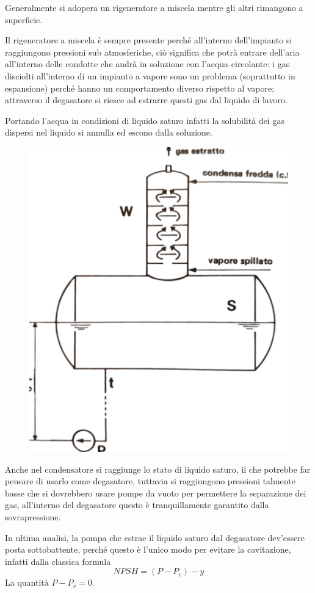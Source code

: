 \begin{adjustwidth}{2in}{}
	Generalmente si adopera un rigeneratore a miscela mentre gli altri rimangono a superficie. 
	
	Il rigeneratore a miscela è sempre presente perché all'interno dell'impianto si raggiungono pressioni sub atmosferiche, ciò significa che potrà entrare dell'aria all'interno delle condotte che andrà in soluzione con l'acqua circolante: i gas disciolti all'interno di un impianto a vapore sono un problema (soprattutto in espansione) perché hanno un comportamento diverso rispetto al vapore; attraverso il degasatore si riesce ad estrarre questi gas dal liquido di lavoro.
	
	Portando l'acqua in condizioni di liquido saturo infatti la solubilità dei gas dispersi nel liquido si annulla ed escono dalla soluzione.
	\begin{figure}[H]
		\centering
		\includegraphics[width=0.4\linewidth]{immagini/degasatore}
		\label{fig:degasatore}
	\end{figure}
	Anche nel condensatore si raggiunge lo stato di liquido saturo, il che potrebbe far pensare di usarlo come degasatore, tuttavia si raggiungono pressioni talmente basse che si dovrebbero usare pompe da vuoto per permettere la separazione dei gas, all'interno del degasatore questo è tranquillamente garantito dalla sovrapressione. \newline 
	
	In ultima analisi, la pompa che estrae il liquido saturo dal degasatore dev'essere posta sottobattente, perché questo è l'unico modo per evitare la cavitazione, infatti dalla classica formula 
	\[NPSH = (P-P_v)-y\]
	La quantità $P-P_v=0$. 	
\end{adjustwidth}


\newpage


